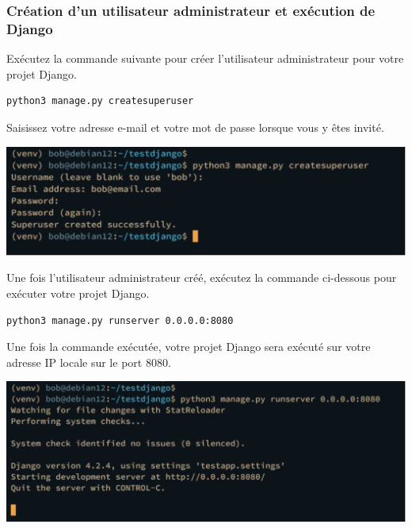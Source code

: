 \documentclass{article}
\begin{document}
\subsubsection{Création d'un utilisateur administrateur et exécution de Django}
Exécutez la commande suivante pour créer l'utilisateur administrateur pour votre projet Django.
\begin{verbatim}
python3 manage.py createsuperuser
\end{verbatim}

Saisissez votre adresse e-mail et votre mot de passe lorsque vous y êtes invité.

\begin{center}
\includegraphics[width=15cm]{images/image15.png}
\end{center}

Une fois l'utilisateur administrateur créé, exécutez la commande ci-dessous pour exécuter votre projet Django.

\begin{verbatim}
python3 manage.py runserver 0.0.0.0:8080
\end{verbatim}

Une fois la commande exécutée, votre projet Django sera exécuté sur votre adresse IP locale sur le port 8080.

\begin{center}
\includegraphics[width=15cm]{images/image16.png}
\end{center}
\end{document}
